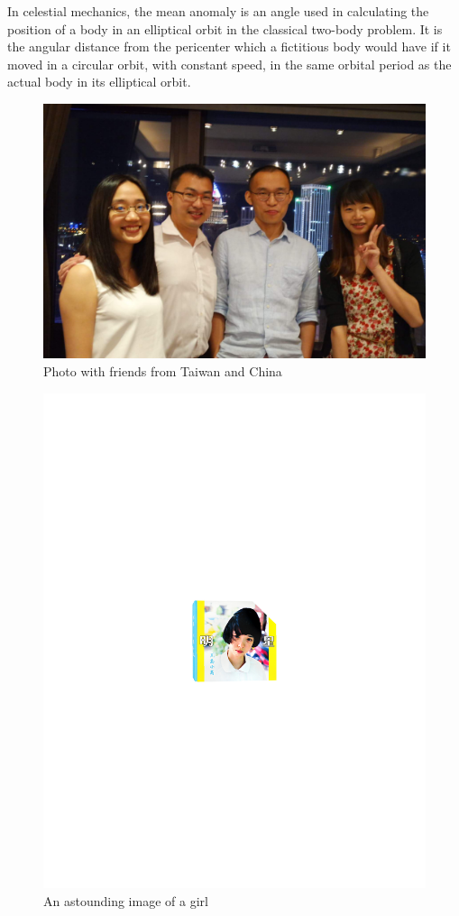 \documentclass{mytemplate}
\begin{document}
\newpage
In celestial mechanics, the mean anomaly is an angle used in calculating the position of a body in an elliptical orbit in the classical two-body problem. It is the angular distance from the pericenter which a fictitious body would have if it moved in a circular orbit, with constant speed, in the same orbital period as the actual body in its elliptical orbit.
\begin{figure}[!htb]
  \includegraphics[width=\linewidth]{graph4.jpg}
  \caption{Photo with friends from Taiwan and China}\label{wedding_friends}
\endminipage\hfill
\end{figure}

\begin{figure}[!htb]
  \includegraphics[width=\linewidth]{graph5.pdf}
  \caption{An astounding image of a girl}\label{taiwan_girl}
\endminipage\hfill
\end{figure}

\end{document}
